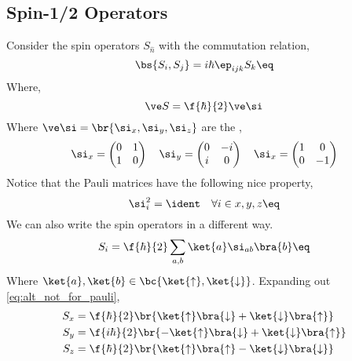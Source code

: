 \documentclass{article}
\begin{document}
\subsection{Spin-1/2 Operators}
Consider the spin operators $S_{\hat{n}}$ with the commutation relation,
\[ \bs{S_i, S_j} = i \hbar \ep_{ijk} S_k \eq \label{eq:spin_commutator}\]
Where,
\[ \ve S = \f{\hbar}{2} \ve \si \]
Where $\ve \si = \br{\si_x, \si_y, \si_z}$ are the ,
\[ \si_x = \begin{pmatrix}0 & 1 \\ 1 & 0 \end{pmatrix} \quad \si_y = \begin{pmatrix}0 & -i \\ i & 0 \end{pmatrix} \quad \si_x = \begin{pmatrix}1 & 0 \\ 0 & -1 \end{pmatrix} \]
Notice that the Pauli matrices have the following nice property,
\[ \si_i^2 = \ident \quad \forall i \in x,y,z \eq \label{eq:pauli_squared_ident} \]
We can also write the spin operators in a different way.
\[ S_i = \f{\hbar}{2} \sum_{a,b} \ket{a} \si_{ab} \bra{b} \eq \label{eq:alt_not_for_pauli}\]
Where $\ket{a}, \ket{b} \in \bc{\ket{\uparrow}, \ket{\downarrow}}$. Expanding out \cref{eq:alt_not_for_pauli},
\begin{align*}
    S_x &= \f{\hbar}{2}\br{\ket{\uparrow}\bra{\downarrow} + \ket{\downarrow}\bra{\uparrow}} \\
    S_y &= \f{i\hbar}{2}\br{-\ket{\uparrow}\bra{\downarrow} + \ket{\downarrow}\bra{\uparrow}} \\
    S_z &= \f{\hbar}{2}\br{\ket{\uparrow}\bra{\uparrow} - \ket{\downarrow}\bra{\downarrow}}
\end{align*}
\end{document}
